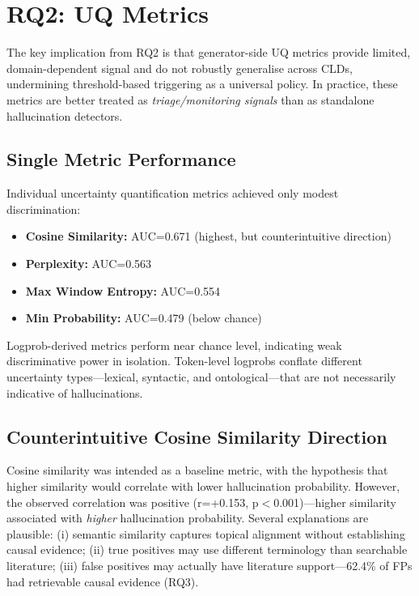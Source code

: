 \section{RQ2: UQ Metrics}
\label{sec:discussion_rq2}

The key implication from RQ2 is that generator-side UQ metrics provide limited, domain-dependent signal and do not robustly generalise across CLDs, undermining threshold-based triggering as a universal policy. In practice, these metrics are better treated as \textit{triage/monitoring signals} than as standalone hallucination detectors.

\subsection{Single Metric Performance}

Individual uncertainty quantification metrics achieved only modest discrimination:
\begin{itemize}[noitemsep]
    \item \textbf{Cosine Similarity:} AUC=0.671 (highest, but counterintuitive direction)
    \item \textbf{Perplexity:} AUC=0.563
    \item \textbf{Max Window Entropy:} AUC=0.554
    \item \textbf{Min Probability:} AUC=0.479 (below chance)
\end{itemize}
Logprob-derived metrics perform near chance level, indicating weak discriminative power in isolation. Token-level logprobs conflate different uncertainty types---lexical, syntactic, and ontological---that are not necessarily indicative of hallucinations.

\subsection{Counterintuitive Cosine Similarity Direction}
\label{sec:cosine_paradox}

Cosine similarity was intended as a baseline metric, with the hypothesis that higher similarity would correlate with lower hallucination probability. However, the observed correlation was positive (r=+0.153, p$<$0.001)---higher similarity associated with \textit{higher} hallucination probability. Several explanations are plausible: (i) semantic similarity captures topical alignment without establishing causal evidence; (ii) true positives may use different terminology than searchable literature; (iii) false positives may actually have literature support---62.4\% of FPs had retrievable causal evidence (RQ3).

